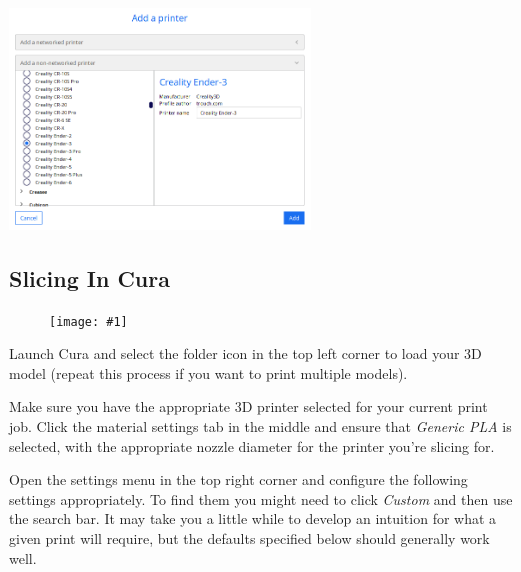 \documentclass[12pt]{report}
\newcommand{\imageright}[3]{
    \begin{figure}
        \centering
        \texttt{[image: \#1]}
        \vspace*{#3}
    \end{figure}
}
\begin{document}
\begin{center}
    \includegraphics[width=0.6\textwidth]{add_printer.png}
    \vspace*{-2cm}
\end{center}

\pagebreak

{

\subsection*{Slicing In Cura}
\label{sec:slicing}

\imageright{slicing_settings.png}{0.25}{-1cm}

Launch Cura and select the folder icon in the top left corner to load your 3D
model (repeat this process if you want to print multiple models). \par
Make sure you have the appropriate 3D printer selected for your current print
job. Click the material settings tab in the middle and ensure that
\textit{Generic PLA} is selected, with the appropriate nozzle diameter for the
printer you're slicing for. \par
Open the settings menu in the top right corner and configure the following
settings appropriately. To find them you might need to click \textit{Custom} and
then use the search bar. It may take you a little while to develop an intuition
for what a given print will require, but the defaults specified below should
generally work well.

}
\end{document}
